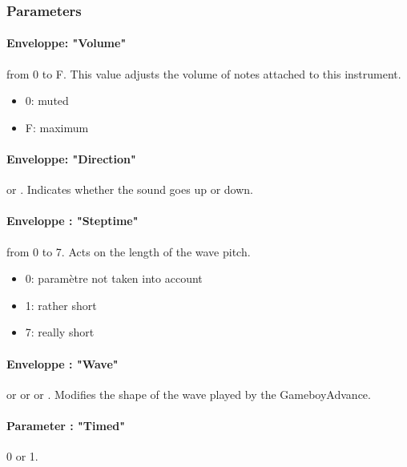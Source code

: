 
\subsubsection{Parameters}

\paragraph{Enveloppe: "Volume"} from 0 to F.
This value adjusts the volume of notes attached to this instrument.
\medskip

\begin{itemize}
    \item{0: muted}
    \item{F: maximum}
\end{itemize}

\paragraph{Enveloppe: "Direction"}  or .
Indicates whether the sound goes up or down.

\paragraph{Enveloppe : "Steptime"} from 0 to 7.
Acts on the length of the wave pitch.
\medskip

\begin{itemize}
    \item{0: paramètre not taken into account}
    \item{1: rather short}
    \item{7: really short}
\end{itemize}

\paragraph{Enveloppe : "Wave"}  or  or  or .
Modifies the shape of the wave played by the GameboyAdvance.

\paragraph{Parameter : "Timed"} 0 or 1.
\medskip


